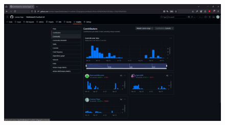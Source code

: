 \begin{figure}[H]
	\centering
	\includegraphics[width=1\linewidth]{"Immagini/Resoconto Commit FE.png"}
	\caption[Resoconto Commit Frontend]{}
	\label{fig:resoconto-commit-frontend}
\end{figure}